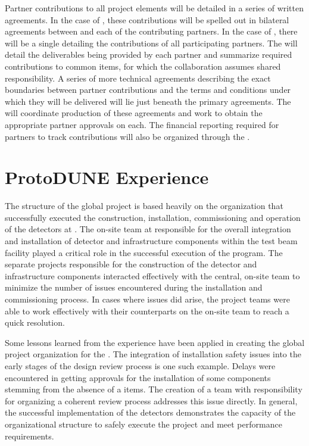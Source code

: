 Partner contributions to all project elements will be detailed in a
series of written agreements.  In the case of , these
contributions will be spelled out in bilateral agreements between
 and each of the contributing partners.  In the case of
, there will be a single  
detailing the contributions of all participating partners.  The  
will detail the deliverables being provided by each partner and
summarize required contributions to common items, for which the
collaboration assumes shared responsibility.  A series of more
technical agreements describing the exact boundaries between partner
contributions and the terms and conditions under which they will be
delivered will lie just beneath the primary agreements.  The
 will coordinate production of these agreements and work to
obtain the appropriate partner approvals %
on each.  The financial
reporting required for partners to track  contributions
will also be organized through the .

\section{ProtoDUNE Experience}
\label{sec:dune_protodune}

The structure of the global project is based heavily on the
organization that successfully executed the construction,
installation, commissioning and operation of the 
detectors at .  The on-site team at  responsible for the
overall integration and installation of detector and infrastructure
components within the test beam facility played a critical role in the
successful execution of the  program.  The separate
projects responsible for the construction of the detector and
infrastructure components interacted effectively with the central,
on-site team to minimize the number of issues encountered during the
installation and commissioning process.  In cases where issues did
arise, the project teams were able to work effectively with their
counterparts on the on-site team to reach a quick resolution.

Some lessons learned from the  experience have been
applied in creating the global project organization for the
 .  The integration of installation safety
issues into the early stages of the design review process is one such
example.  Delays were encountered in getting approvals for the
installation of some  components stemming from the absence
of a %
items.  The creation of a  team with responsibility for
organizing a coherent review process addresses this issue directly.
In general, the successful implementation of the 
detectors demonstrates the capacity of the organizational structure to
safely execute the project and meet performance requirements.
